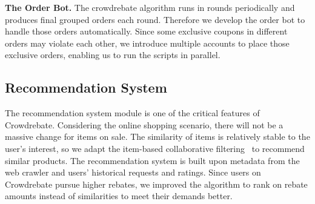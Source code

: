 \textbf{The Order Bot.} The crowdrebate algorithm runs in rounds periodically and produces final grouped orders each round. Therefore we develop the order bot to handle those orders automatically. Since some exclusive coupons in different orders may violate each other, we introduce multiple accounts to place those exclusive orders, enabling us to run the scripts in parallel.

\subsection{Recommendation System}

The recommendation system module is one of the critical features of Crowdrebate. Considering the online shopping scenario, there will not be a massive change for items on sale. The similarity of items is relatively stable to the user’s interest, so we adapt the item-based collaborative filtering~\cite{sarwar2001item} to recommend similar products. The recommendation system is built upon metadata from the web crawler and users’ historical requests and ratings. Since users on Crowdrebate pursue higher rebates, we improved the algorithm to rank on rebate amounts instead of similarities to meet their demands better. 